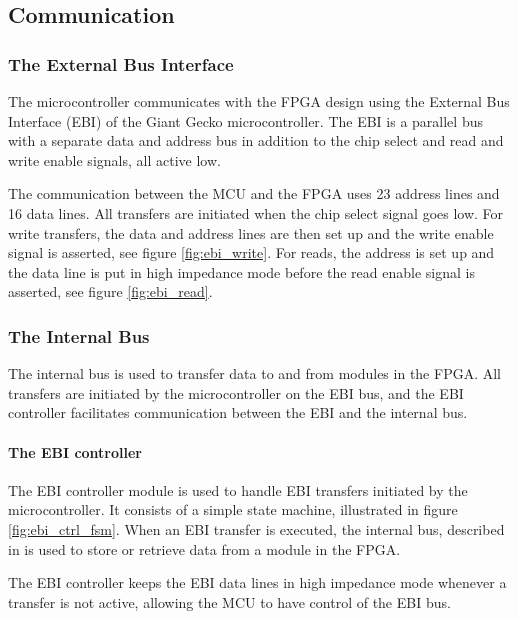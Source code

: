 \FloatBarrier
\subsection{Communication}\label{section:fpga-buses}

\subsubsection{The External Bus Interface}
The microcontroller communicates with the FPGA design using the External Bus
Interface (EBI) of the Giant Gecko microcontroller. The EBI is a parallel bus
with a separate data and address bus in addition to the chip select and read and
write enable signals, all active low\cite{efm_ebi}.

The communication between the MCU and the FPGA uses 23 address lines and 16
data lines. All transfers are initiated when the chip select signal goes low.
For write transfers, the data and address lines are then set up and the
write enable signal is asserted, see figure \ref{fig:ebi_write}. For reads,
the address is set up and the data line is put in high impedance mode before
the read enable signal is asserted, see figure \ref{fig:ebi_read}.




\FloatBarrier
\subsubsection{The Internal Bus}

The internal bus is used to transfer data to and from modules in the FPGA.
All transfers are initiated by the microcontroller on the EBI bus, and the
EBI controller facilitates communication between the EBI and the
internal bus.

\paragraph{The EBI controller}
The EBI controller module is used to handle EBI transfers initiated by the
microcontroller. It consists of a simple state machine, illustrated in
figure \ref{fig:ebi_ctrl_fsm}. When an EBI transfer is executed, the
internal bus, described in is used to store or retrieve data from a module
in the FPGA.

The EBI controller keeps the EBI data lines in high impedance mode whenever
a transfer is not active, allowing the MCU to have control of the EBI bus.

